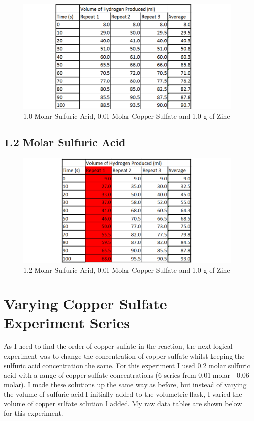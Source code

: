 \begin{figure}[H]
    \includegraphics[width=\textwidth]{./Experiment/Images/2FixedCatalyst/10Molar.pdf}
    \caption{1.0 Molar Sulfuric Acid, 0.01 Molar Copper Sulfate and 1.0 g of Zinc} \label{fig:10SACSRawData}
\end{figure}

	\subsection{1.2 Molar Sulfuric Acid}

\begin{figure}[H]
    \includegraphics[width=\textwidth]{./Experiment/Images/2FixedCatalyst/12Molar.pdf}
    \caption{1.2 Molar Sulfuric Acid, 0.01 Molar Copper Sulfate and 1.0 g of Zinc} \label{fig:12SACSRawData}
\end{figure}


\section{Varying Copper Sulfate Experiment Series}

As I need to find the order of copper sulfate in the reaction, the next logical experiment was to change the concentration of copper sulfate whilst keeping the sulfuric acid concentration the same. For this experiment I used 0.2 molar sulfuric acid with a range of copper sulfate concentrations (6 series from 0.01 molar - 0.06 molar). I made these solutions up the same way as before, but instead of varying the volume of sulfuric acid I initially added to the volumetric flask, I varied the volume of copper sulfate solution I added.  My raw data tables are shown below for this experiment. 

